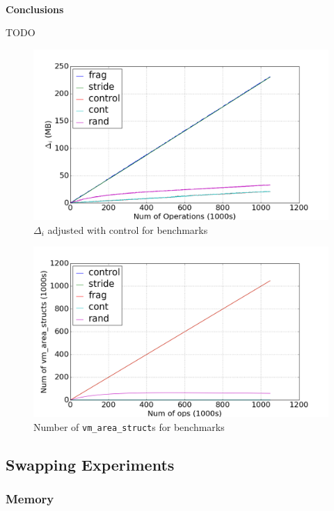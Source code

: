 \documentclass[twocolumn,11pt]{article}
\begin{document}
~\\ \textbf{Conclusions}

TODO

\begin{figure}
    \includegraphics[width=\columnwidth]{figures/mmap_mem_usage}
    \caption{$\Delta_i$ adjusted with control for benchmarks}
    \label{fig:mmap_mem_usage}
\end{figure}

\begin{figure}
    \includegraphics[width=\columnwidth]{figures/vm_area_struct_count}
    \caption{Number of \texttt{vm\_area\_struct}s for benchmarks}
    \label{fig:vm_area_struct_count}
\end{figure}


\subsection{Swapping Experiments}

\subsubsection{Memory}
\end{document}
